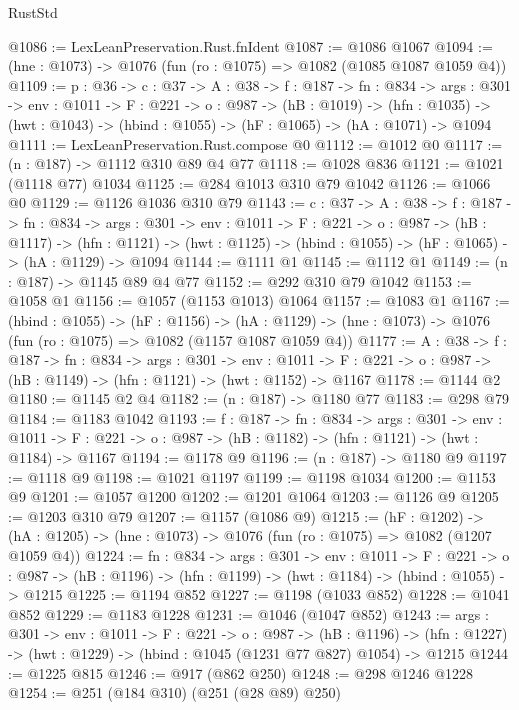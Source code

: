 \begin{lexlean}{RustStd}
\begin{coremodule}
@1086 := LexLeanPreservation.Rust.fnIdent
@1087 := @1086 @1067
@1094 := (hne : @1073) -> @1076 (fun (ro : @1075) => @1082 (@1085 @1087 @1059 @4))
@1109 := {p : @36} ->
  {c : @37} ->
  {A : @38} ->
  {f : @187} ->
  {fn : @834} ->
  {args : @301} ->
  {env : @1011} ->
  {F : @221} ->
  {o : @987} ->
  (hB : @1019) ->
  (hfn : @1035) -> (hwt : @1043) -> (hbind : @1055) -> (hF : @1065) -> (hA : @1071) -> @1094
@1111 := LexLeanPreservation.Rust.compose @0
@1112 := @1012 @0
@1117 := (n : @187) -> @1112 @310 @89 @4 @77
@1118 := @1028 @836
@1121 := @1021 (@1118 @77) @1034
@1125 := @284 @1013 @310 @79 @1042
@1126 := @1066 @0
@1129 := @1126 @1036 @310 @79
@1143 := {c : @37} ->
  {A : @38} ->
  {f : @187} ->
  {fn : @834} ->
  {args : @301} ->
  {env : @1011} ->
  {F : @221} ->
  {o : @987} ->
  (hB : @1117) ->
  (hfn : @1121) -> (hwt : @1125) -> (hbind : @1055) -> (hF : @1065) -> (hA : @1129) -> @1094
@1144 := @1111 @1
@1145 := @1112 @1
@1149 := (n : @187) -> @1145 @89 @4 @77
@1152 := @292 @310 @79 @1042
@1153 := @1058 @1
@1156 := @1057 (@1153 @1013) @1064
@1157 := @1083 @1
@1167 := (hbind : @1055) ->
  (hF : @1156) ->
  (hA : @1129) -> (hne : @1073) -> @1076 (fun (ro : @1075) => @1082 (@1157 @1087 @1059 @4))
@1177 := {A : @38} ->
  {f : @187} ->
  {fn : @834} ->
  {args : @301} ->
  {env : @1011} ->
  {F : @221} -> {o : @987} -> (hB : @1149) -> (hfn : @1121) -> (hwt : @1152) -> @1167
@1178 := @1144 @2
@1180 := @1145 @2 @4
@1182 := (n : @187) -> @1180 @77
@1183 := @298 @79
@1184 := @1183 @1042
@1193 := {f : @187} ->
  {fn : @834} ->
  {args : @301} ->
  {env : @1011} ->
  {F : @221} -> {o : @987} -> (hB : @1182) -> (hfn : @1121) -> (hwt : @1184) -> @1167
@1194 := @1178 @9
@1196 := (n : @187) -> @1180 @9
@1197 := @1118 @9
@1198 := @1021 @1197
@1199 := @1198 @1034
@1200 := @1153 @9
@1201 := @1057 @1200
@1202 := @1201 @1064
@1203 := @1126 @9
@1205 := @1203 @310 @79
@1207 := @1157 (@1086 @9)
@1215 := (hF : @1202) ->
  (hA : @1205) -> (hne : @1073) -> @1076 (fun (ro : @1075) => @1082 (@1207 @1059 @4))
@1224 := {fn : @834} ->
  {args : @301} ->
  {env : @1011} ->
  {F : @221} ->
  {o : @987} -> (hB : @1196) -> (hfn : @1199) -> (hwt : @1184) -> (hbind : @1055) -> @1215
@1225 := @1194 @852
@1227 := @1198 (@1033 @852)
@1228 := @1041 @852
@1229 := @1183 @1228
@1231 := @1046 (@1047 @852)
@1243 := {args : @301} ->
  {env : @1011} ->
  {F : @221} ->
  {o : @987} ->
  (hB : @1196) -> (hfn : @1227) -> (hwt : @1229) -> (hbind : @1045 (@1231 @77 @827) @1054) -> @1215
@1244 := @1225 @815
@1246 := @917 (@862 @250)
@1248 := @298 @1246 @1228
@1254 := @251 (@184 @310) (@251 (@28 @89) @250)

\end{coremodule}
\end{lexlean}
